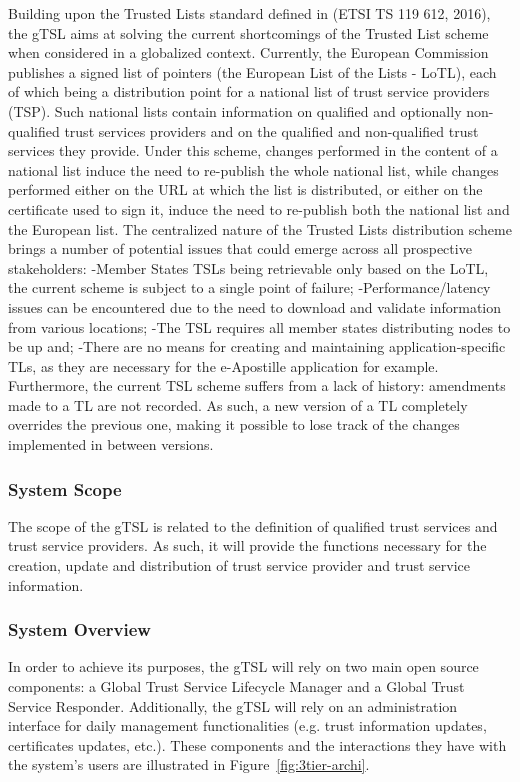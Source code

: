 \documentclass{tnreport}
\begin{document}
Building upon the Trusted Lists standard defined in (ETSI TS 119 612, 2016), the gTSL aims at solving the current shortcomings of the Trusted List scheme when considered in a globalized context.
Currently, the European Commission publishes a signed list of pointers (the European List of the Lists - LoTL), each of which being a distribution point for a national list of trust service providers (TSP). Such national lists contain information on qualified and optionally non-qualified trust services providers and on the qualified and non-qualified trust services they provide. Under this scheme, changes performed in the content of a national list induce the need to re-publish the whole national list, while changes performed either on the URL at which the list is distributed, or either on the certificate used to sign it, induce the need to re-publish both the national list and the European list.
The centralized nature of the Trusted Lists distribution scheme brings a number of potential issues that could emerge across all prospective stakeholders:
-Member States TSLs being retrievable only based on the LoTL, the current scheme is subject to a single point of failure;
-Performance/latency issues can be encountered due to the need to download and validate information from various locations;
-The TSL requires all member states distributing nodes to be up and;
-There are no means for creating and maintaining application-specific TLs, as they are necessary for the e-Apostille application for example.
Furthermore, the current TSL scheme suffers from a lack of history: amendments made to a TL are not recorded. As such, a new version of a TL completely overrides the previous one, making it possible to lose track of the changes implemented in between versions.

\subsubsection{System Scope}

The scope of the gTSL is related to the definition of qualified trust services and trust service providers. As such, it will provide the functions necessary for the creation, update and distribution of trust service provider and trust service information.

\subsubsection{System Overview}

In order to achieve its purposes, the gTSL will rely on two main open source components: a Global Trust Service Lifecycle Manager and a Global Trust Service Responder. Additionally, the gTSL will rely on an administration interface for daily management functionalities (e.g. trust information updates, certificates updates, etc.).
These components and the interactions they have with the system’s users are illustrated in Figure~\ref{fig:3tier-archi}.
\end{document}
